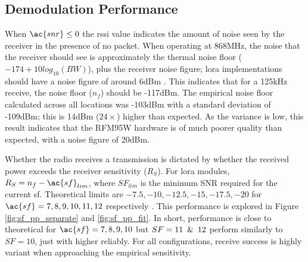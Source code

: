 \subsection{Demodulation Performance}\label{sec:demodulation_performance}
When $\ac{snr} \leq 0$ the \ac{rssi} value indicates the amount of noise seen by the receiver in the presence of no packet. When operating at 868MHz, the noise that the receiver should see is approximately the thermal noise floor ($-174+10log_{10}(BW)$), plus the receiver noise figure; \ac{lora} implementations should have a noise figure of around 6dBm \cite{3YP:LORA_MOD_BASICS}. This indicates that for a 125kHz receive, the noise floor ($n_f$) should be -117dBm. The empirical noise floor calculated across all locations was -103dBm with a standard deviation of -109dBm; this is 14dBm ($24\times$) higher than expected. As the variance is low, this result indicates that the RFM95W hardware is of much poorer quality than expected, with a noise figure of 20dBm.

Whether the radio receives a transmission is dictated by whether the received power exceeds the receiver sensitivity ($R_S$). For \ac{lora} modules, $R_S = n_f - \ac{sf}_{lim}$, where $SF_{lim}$ is the minimum SNR required for the current \ac{sf}. Theoretical limits are $-7.5, -10, -12.5, -15, -17.5, -20$ for $\ac{sf} = 7, 8, 9, 10, 11, 12$ respectively \cite{3YP:LORA_SX12}. This performance is explored in Figure \ref{fig:sf_pp_separate} and \ref{fig:sf_pp_fit}. In short, performance is close to theoretical for $\ac{sf} = 7, 8, 9, 10$ but $SF=11\enskip \& \enskip 12$ perform similarly to $SF=10$, just with higher reliably. For all configurations, receive success is highly variant when approaching the empirical sensitivity.

